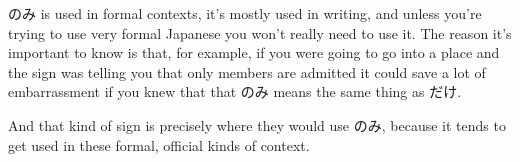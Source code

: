 のみ is used in formal contexts, it's mostly used in writing, and unless you're trying to use very formal Japanese you won't really need to use it. The reason it's important to know is that, for example, if you were going to go into a place and the sign was telling you that only members are admitted it could save a lot of embarrassment if you knew that that のみ means the same thing as だけ.

And that kind of sign is precisely where they would use のみ, because it tends to get used in these formal, official kinds of context.

\stopsectionlevel

\stopsectionlevel

